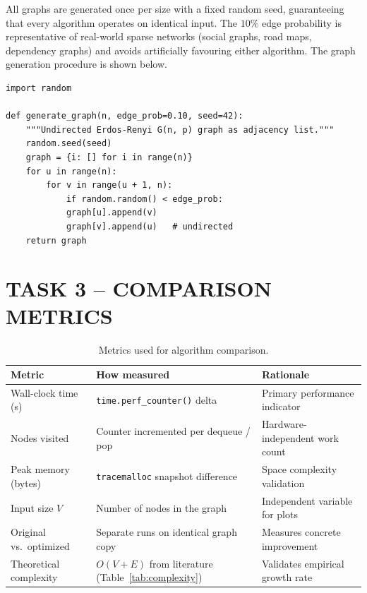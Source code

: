 \documentclass[12pt,a4paper]{article}
\begin{document}
	\noindent All graphs are generated once per size with a fixed random seed,
	guaranteeing that every algorithm operates on identical input. The $10\%$ edge
	probability is representative of real-world sparse networks (social graphs, road
	maps, dependency graphs) and avoids artificially favouring either algorithm. The
	graph generation procedure is shown below.
	
	\begin{lstlisting}[caption={Random graph generator -- Erdos-Renyi $G(V,p)$ model.}]
import random
		
def generate_graph(n, edge_prob=0.10, seed=42):
	"""Undirected Erdos-Renyi G(n, p) graph as adjacency list."""
	random.seed(seed)
	graph = {i: [] for i in range(n)}
	for u in range(n):
		for v in range(u + 1, n):
			if random.random() < edge_prob:
			graph[u].append(v)
			graph[v].append(u)   # undirected
	return graph
	\end{lstlisting}
	
	\section{TASK 3 -- COMPARISON METRICS}
	
	\begin{table}[h!]
		\centering
		\caption{Metrics used for algorithm comparison.}
		\label{tab:metrics}
		\renewcommand{\arraystretch}{1.3}
		\begin{tabular}{lll}
			\toprule
			\textbf{Metric}          & \textbf{How measured}                                    & \textbf{Rationale} \\
			\midrule
			Wall-clock time (s)      & \texttt{time.perf\_counter()} delta                      & Primary performance indicator \\
			Nodes visited            & Counter incremented per dequeue / pop                    & Hardware-independent work count \\
			Peak memory (bytes)      & \texttt{tracemalloc} snapshot difference                 & Space complexity validation \\
			Input size $V$           & Number of nodes in the graph                             & Independent variable for plots \\
			Original vs.\ optimized  & Separate runs on identical graph copy                    & Measures concrete improvement \\
			Theoretical complexity   & $O(V+E)$ from literature (Table~\ref{tab:complexity})    & Validates empirical growth rate \\
			\bottomrule
		\end{tabular}
	\end{table}
	
\end{document}
